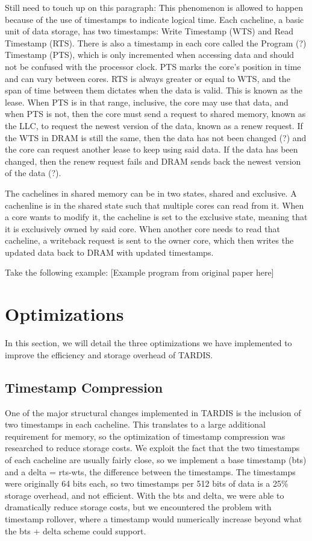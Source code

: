 \documentclass[12pt]{article}
\begin{document}
Still need to touch up on this paragraph: This phenomenon is allowed to happen because of the use of timestamps to indicate logical time. Each cacheline, a basic unit of data storage, has two timestamps: Write Timestamp (WTS) and Read Timestamp (RTS). There is also a timestamp in each core called the Program (?) Timestamp (PTS), which is only incremented when accessing data and should not be confused with the processor clock. PTS marks the core’s position in time and can vary between cores. RTS is always greater or equal to WTS, and the span of time between them dictates when the data is valid. This is known as the lease. When PTS is in that range, inclusive, the core may use that data, and when PTS is not, then the core must send a request to shared memory, known as the LLC, to request the newest version of the data, known as a renew request. If the WTS in DRAM is still the same, then the data has not been changed (?) and the core can request another lease to keep using said data. If the data has been changed, then the renew request fails and DRAM sends back the newest version of the data (?).

The cachelines in shared memory can be in two states, shared and exclusive. A cachenline is in the shared state such that multiple cores can read from it. When a core wants to modify it, the cacheline is set to the exclusive state, meaning that it is exclusively owned by said core. When another core needs to read that cacheline, a writeback request is sent to the owner core, which then writes the updated data back to DRAM with updated timestamps.

Take the following example:
[Example program from original paper here]

\section{Optimizations} \label{sec:optimization}

In this section, we will detail the three optimizations we  have implemented to improve the efficiency and storage overhead of TARDIS.

\subsection{Timestamp Compression}

One of the major structural changes implemented in TARDIS is the inclusion of two timestamps in each cacheline. This translates to a large additional requirement for memory, so the optimization of timestamp compression was researched to reduce storage costs. We exploit the fact that the two timestamps of each cacheline are usually fairly close, so we implement a base timestamp (bts) and a delta = rts-wts, the difference between the timestamps. The timestamps were originally 64 bits each, so two timestamps per 512 bits of data is a 25\% storage overhead, and not efficient.  With the bts and delta, we were able to dramatically reduce storage costs, but we encountered the problem with timestamp rollover, where a timestamp would numerically increase beyond what the bts + delta scheme could support.
\end{document}
